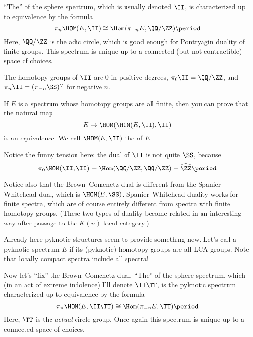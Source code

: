 \documentclass[leqno]{article}
\begin{document}
\enquote{The}  of the sphere spectrum,
which is usually denoted \(\II\), is characterized up to equivalence
by the formula
\begin{equation*}
    \pi_n \HOM(E, \II) \cong \Hom(\pi_{-n} E, \QQ/\ZZ) \period
\end{equation*}
Here, \(\QQ/\ZZ\) is the adic circle,
which is good enough for Pontryagin duality of finite groups.
This spectrum is unique up to a connected
(but not contractible) space of choices.

The homotopy groups of \(\II\) are \(0\) in positive degrees,
\(\pi_{0}\II = \QQ/\ZZ\), and
\(\pi_{n}\II = (\pi_{-n}\SS)^{\vee}\) for negative \(n\).

If \(E\) is a spectrum whose homotopy groups are all finite,
then you can prove that the natural map
\begin{equation*}
    E \mapsto \HOM(\HOM(E, \II), \II)
\end{equation*}
is an equivalence.
We call \(\HOM(E,\II)\) the  of \(E\).

Notice the funny tension here:
the dual of \(\II\) is not quite \(\SS\), because
\begin{equation*}
    \pi_{0}\HOM(\II,\II) = \Hom(\QQ/\ZZ, \QQ/\ZZ)
    = \widehat{\ZZ} \period
\end{equation*}

Notice also that the Brown--Comenetz dual is different
from the Spanier--Whitehead dual,
which is \(\HOM(E,\SS)\).
Spanier--Whitehead duality works for finite spectra,
which are of course entirely different from spectra
with finite homotopy groups.
(These two types of duality become related in an interesting way
after passage to the \(K(n)\)-local category.)

Already here pyknotic structures seem to provide something new.
Let's call a pyknotic spectrum \(E\) 
if its (pyknotic) homotopy groups are all LCA groups.
Note that locally compact spectra include all spectra!

Now let's \enquote{fix} the Brown--Comenetz dual.
\enquote{The}  of the sphere spectrum, which
(in an act of extreme indolence)
I'll denote \(\II\TT\),
is the pyknotic spectrum
characterized up to equivalence by the formula
\begin{equation*}
    \pi_n \HOM(E, \II\TT) \cong \Hom(\pi_{-n} E, \TT) \period
\end{equation*}
Here, \(\TT\) is the \emph{actual} circle group.
Once again this spectrum is unique up to a connected
space of choices.
\end{document}
